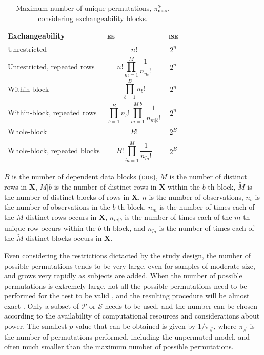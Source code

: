 \begin{table}[p]
\caption{Maximum number of unique permutations, $\pi^{\mathcal{P}}_{\text{max}}$, considering exchangeability blocks.}
\begin{center}
{\small
\begin{tabular}{@{}m{62mm}<{\raggedright}m{44mm}<{\centering}@{}m{15mm}<{\centering}@{}}
\toprule
Exchangeability & \textsc{ee}   & \textsc{ise}\\
\midrule
Unrestricted & \[n!\] & \[2^n\]\\
\midrule
Unrestricted, repeated rows & \[n!\prod_{m=1}^M \frac{1}{n_m!}\] & \[2^n\] \\
\midrule
Within-block & \[\prod_{b=1}^{B} n_{b}!\] & \[2^n\] \\
\midrule
Within-block, repeated rows & \[\prod_{b=1}^{B} n_{b}! \prod_{m=1}^{M|b} \frac{1}{n_{m|b}!}\] & \[2^n\] \\
\midrule
Whole-block  & \[B!\] & \[2^B\]\\
\midrule
Whole-block, repeated blocks  & \[B!\prod_{\tilde{m}=1}^{\tilde{M}} \frac{1}{n_{\tilde{m}}!}\] & \[2^B\]\\
\bottomrule
\end{tabular}}
\end{center}
{\footnotesize
$B$ is the number of dependent data blocks (\textsc{ddb}),
$M$ is the number of distinct rows in $\mathbf{X}$,
$M|b$ is the number of distinct rows in $\mathbf{X}$ within the $b$-th block,
$\tilde{M}$ is the number of distinct blocks of rows in $\mathbf{X}$,
$n$ is the number of observations,
$n_b$ is the number of observations in the $b$-th block,
$n_m$ is the number of times each of the $M$ distinct rows occurs in $\mathbf{X}$,
$n_{m|b}$ is the number of times each of the $m$-th unique row occurs within the $b$-th block, and
$n_{\tilde{m}}$ is the number of times each of the $\tilde{M}$ distinct blocks occurs in $\mathbf{X}$.}
\label{tab:numperm}
\end{table}

Even considering the restrictions dictacted by the study design, the number of possible permutations tends to be very large, even for samples of moderate size, and grows very rapidly as subjects are added. When the number of possible permutations is extremely large, not all the possible permutations need to be performed for the test to be valid \citep{Dwass1957, Chung1958}, and the resulting procedure will be almost exact \citep{Edgington1969}. Only a subset of $\mathcal{P}$ or $\mathcal{S}$ needs to be used, and the number can be chosen according to the availability of computational resources and considerations about power. The smallest $p$-value that can be obtained is given by $1/\pi_{\text{\#}}$, where $\pi_{\text{\#}}$ is the number of permutations performed, including the unpermuted model, and often much smaller than the maximum number of possible permutations.

